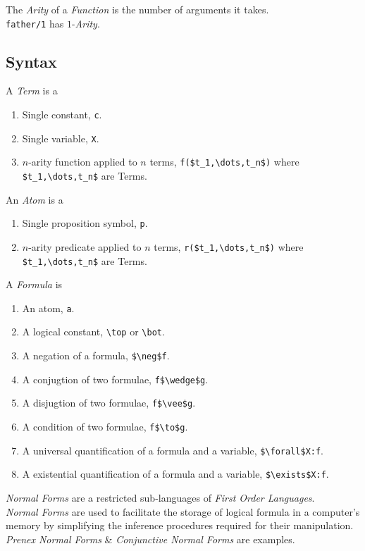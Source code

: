 \documentclass[11pt,a4paper]{article}
\begin{document}
The \textit{Arity} of a \textit{Function} is the number of arguments it takes.\\
\eg \lstinline!father/1! has $1$-\textit{Arity}.\\

\subsection{Syntax}

A \textit{Term} is a 
\begin{enumerate}
	\item Single constant, \lstinline!c!.
	\item Single variable, \lstinline!X!.
	\item $n$-arity function applied to $n$ terms, \lstinline!f($t_1,\dots,t_n$)! where \lstinline!$t_1,\dots,t_n$! are Terms.
\end{enumerate}

An \textit{Atom} is a
\begin{enumerate}
	\item Single proposition symbol, \lstinline!p!.
	\item $n$-arity predicate applied to $n$ terms, \lstinline!r($t_1,\dots,t_n$)! where \lstinline!$t_1,\dots,t_n$! are Terms.
\end{enumerate}

A \textit{Formula} is 
\begin{enumerate}
	\item An atom, \lstinline!a!.
	\item A logical constant, \lstinline!\top! or \lstinline!\bot!.
	\item A negation of a formula, \lstinline!$\neg$f!.
	\item A conjugtion of two formulae, \lstinline!f$\wedge$g!.
	\item A disjugtion of two formulae, \lstinline!f$\vee$g!.
	\item A condition of two formulae, \lstinline!f$\to$g!.
	\item A universal quantification of a formula and a variable, \lstinline!$\forall$X:f!.
	\item A existential quantification of a formula and a variable, \lstinline!$\exists$X:f!.
\end{enumerate}

\textit{Normal Forms} are a restricted sub-languages of \textit{First Order Languages}.\\
\textit{Normal Forms} are used to facilitate the storage of logical formula in a computer's memory by simplifying the inference procedures required for their manipulation.\\
\nb \textit{Prenex Normal Forms} \& \textit{Conjunctive Normal Forms} are examples.\\
\end{document}

